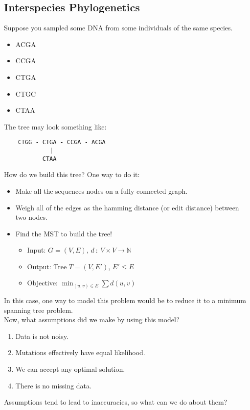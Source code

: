 \documentclass[10pt]{article}
\begin{document}
\subsection*{Interspecies Phylogenetics}
Suppose you sampled some DNA from some individuals of the same species.
\begin{itemize}
	\item ACGA
	\item CCGA
	\item CTGA
	\item CTGC
	\item CTAA
\end{itemize}
The tree may look something like:
\begin{verbatim}
    CTGG - CTGA - CCGA - ACGA
             |
           CTAA
\end{verbatim}
How do we build this tree?  One way to do it:
\begin{itemize}
	\item Make all the sequences nodes on a fully connected graph.
	\item Weigh all of the edges as the hamming distance (or edit distance) between two nodes.
	\item Find the MST to build the tree!
	\begin{itemize}
        \item Input: $G = (V, E)$, $d \::\: V \times V \rightarrow \mathbb{N}$
        \item Output: Tree $T = (V, E')$, $E' \leq E$
        \item Objective: $\min_{(u, v) \in E} \sum d(u, v)$
    \end{itemize}
\end{itemize}
In this case, one way to model this problem would be to reduce it to a minimum spanning tree problem.\\
Now, what assumptions did we make by using this model?
\begin{enumerate}
	\item Data is not noisy.
	\item Mutations effectively have equal likelihood.
	\item We can accept any optimal solution.
	\item There is no missing data.
\end{enumerate}
Assumptions tend to lead to inaccuracies, so what can we do about them?
\end{document}
